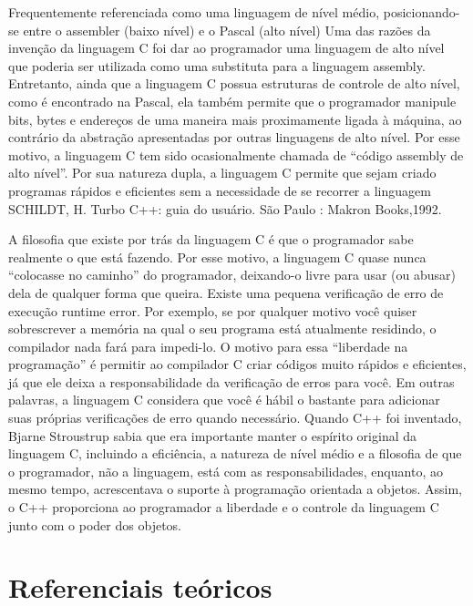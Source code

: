 \documentclass[
    12pt,               %
    openright,          %
    twoside,            %
    a4paper,            %
    brazil              %
    ]{abntex2}
\begin{document}
Frequentemente referenciada como uma linguagem de nível médio, posicionando-se entre o assembler 
(baixo nível) e o Pascal (alto nível) Uma das razões da invenção da linguagem C foi dar ao programador 
uma linguagem de alto nível que poderia ser utilizada como uma substituta para a linguagem assembly. 
Entretanto, ainda que a linguagem C possua estruturas de controle de alto nível, como é encontrado na 
Pascal, ela também permite que o programador manipule bits, bytes e endereços de uma maneira mais 
proximamente ligada à máquina, ao contrário da abstração apresentadas por outras linguagens de alto 
nível. Por esse motivo, a linguagem C tem sido ocasionalmente chamada de “código assembly de alto 
nível”. Por sua natureza dupla, a linguagem C permite que sejam criado programas rápidos e eficientes 
sem a necessidade de se recorrer a linguagem SCHILDT, H. Turbo C++: guia do usuário. São Paulo : 
Makron Books,1992.

A filosofia que existe por trás da linguagem C é que o programador sabe realmente o que está fazendo. 
Por esse motivo, a linguagem C quase nunca “colocasse no caminho” do programador, deixando-o livre 
para usar (ou abusar) dela de qualquer forma que queira. Existe uma pequena verificação de erro de 
execução runtime error. Por exemplo, se por qualquer motivo você quiser sobrescrever a memória na qual 
o seu programa está atualmente residindo, o compilador nada fará para impedi-lo. O motivo para essa 
“liberdade na programação” é permitir ao compilador C criar códigos muito rápidos e eficientes, já 
que ele deixa a responsabilidade da verificação de erros para você. Em outras palavras, a linguagem C 
considera que você é hábil o bastante para adicionar suas próprias verificações de erro quando necessário. 
Quando C++ foi inventado, Bjarne Stroustrup sabia que era importante manter o espírito original da 
linguagem C, incluindo a eficiência, a natureza de nível médio e a filosofia de que o programador, 
não a linguagem, está com as responsabilidades, enquanto, ao mesmo tempo, acrescentava o suporte à 
programação orientada a objetos. Assim, o C++ proporciona ao programador a liberdade e o controle da 
linguagem C junto com o poder dos objetos.



\part{Referenciais teóricos}
\end{document}
